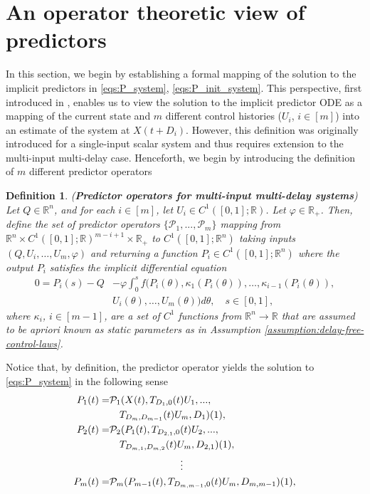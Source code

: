 \documentclass[letterpaper, 10 pt, conference]{ieeeconf}  %
\newtheorem{definition}[theorem]{Definition}
\begin{document}
\section{An operator theoretic view of predictors} \label{sec:predictor-operator}
In this section, we begin by establishing a formal mapping of the solution to the implicit predictors in \eqref{eqs:P_system}, \eqref{eqs:P_init_system}. This perspective, first introduced in \cite{Luke_Peijia:2025}, enables us to view the solution to the implicit predictor ODE as a mapping of the current state and $m$ different control histories ($U_i$, $i \in [m]$) into an estimate of the system at $X(t+D_i)$. However, this definition was originally introduced for a single-input scalar system and thus requires extension to the multi-input multi-delay case. Henceforth, we begin by introducing the definition of $m$ different predictor operators
\begin{definition}\label{def:delay_dependent_predictor_operators}
(\textbf{Predictor operators for multi-input multi-delay systems}) Let $Q \in \mathbb{R}^n$, and for each $i \in [m]$, let $U_i \in C^1([0,1];\mathbb{R})$. Let $\varphi \in \mathbb{R}_+$. Then, define the set of predictor operators $\{\mathcal{P}_1, ..., \mathcal{P}_m\}$ mapping from $\mathbb{R}^n \times C^1([0,1];\mathbb{R})^{m-i+1} \times \mathbb{R}_+$ to $C^1([0,1];\mathbb{R}^n)$ taking
 inputs $(Q,U_i,\dots,U_m, \varphi)$ and returning a function $P_i \in C^1([0,1];\mathbb{R}^n)$ where the output $P_i$ satisfies the implicit differential equation
\begin{align}
    0 = P_i(s) - Q& - \varphi \int_0^s f(P_i(\theta), \kappa_1(P_i(\theta)), \dots, \kappa_{i-1}(P_i(\theta)),\nonumber \\ 
    &U_i(\theta), \dots, U_m(\theta)) d\theta , \quad s \in [0,1], \label{eq:predictor_def_Pi}
\end{align}
where $\kappa_i$, $i \in [m-1]$, are a set of $C^1$ functions from $\mathbb{R}^n \to \mathbb{R}$ that are assumed to be apriori known as static parameters as in Assumption \ref{assumption:delay-free-control-laws}.
\end{definition}
Notice that, by definition, the predictor operator yields the solution to \eqref{eqs:P_system} in the following sense
\begin{subequations}
\begin{align}
    P_1(t) =& \mathcal{P}_1(X(t), T_{D_1,0}(t)U_1, ..., \nonumber \\ & \quad  T_{D_m,D_{m-1}}(t)U_m, D_1)(1), \\
    P_2(t) =& \mathcal{P}_2(P_1(t), T_{D_{2,1},0}(t)U_2, ..., \nonumber \\ & \quad T_{D_{m,1},D_{m,2}}(t)U_m, D_{2,1})(1), \\
    & \hspace{2.5cm} \vdots \nonumber \\
    P_m(t) =& \mathcal{P}_m(P_{m-1}(t), T_{D_{m,m-1},0}(t)U_m, D_{m,m-1})(1),
\end{align}
\end{subequations}
\end{document}
